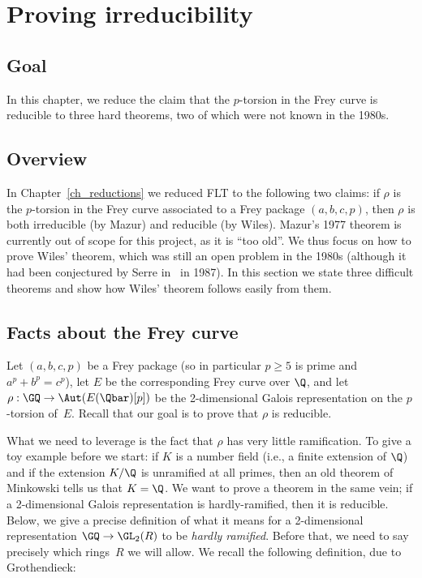 \chapter{Proving irreducibility}\label{ch_freyreduction}

\section{Goal}

In this chapter, we reduce the claim that the $p$-torsion in the Frey
curve is reducible to three hard theorems, two of which were not known
in the 1980s.

\section{Overview}

In Chapter~\ref{ch_reductions} we reduced FLT to the
following two claims: if $\rho$ is the $p$-torsion in the Frey curve
associated to a Frey package $(a,b,c,p)$, then $\rho$ is both
irreducible (by Mazur) and reducible (by Wiles). Mazur's 1977 theorem
is currently out of scope for this project, as it is ``too old''.
We thus focus on how to prove Wiles' theorem, which was still an open problem
in the 1980s (although it had been conjectured by Serre in~\cite{serreconj}
in 1987). In this section we state three difficult theorems and
show how Wiles' theorem follows easily from them.

\section{Facts about the Frey curve}

Let $(a,b,c,p)$ be a Frey package (so in particular $p\geq5$ is prime and $a^p+b^p=c^p$),
let $E$ be the corresponding Frey curve over $\Q$, and let $\rho:\GQ\to\Aut(E(\Qbar)[p])$
be the 2-dimensional Galois representation on the $p$-torsion of~$E$. Recall that our goal
is to prove that $\rho$ is reducible.

What we need to leverage is the fact that $\rho$ has very little ramification. To give
a toy example before we start: if $K$ is a number field (i.e., a finite extension of $\Q$)
and if the extension $K/\Q$ is unramified at all primes, then an old theorem of
Minkowski tells us that $K=\Q$. We want to prove a theorem in the same vein; if
a 2-dimensional Galois representation is hardly-ramified, then it is reducible.
Below, we give a precise
definition of what it means for a 2-dimensional representation $\GQ\to\GL_2(R)$
to be \emph{hardly ramified}. Before that, we need to say precisely which rings~$R$
we will allow. We recall the following definition, due to Grothendieck:


